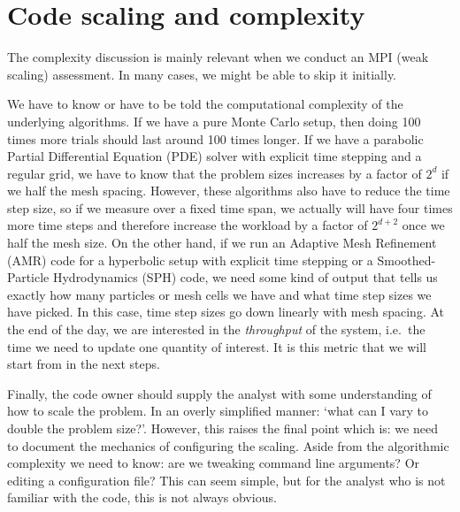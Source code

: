 \section{Code scaling and complexity}
\label{section:preparation:complexity}


\begin{readerguide}
 The complexity discussion is mainly relevant when we conduct an MPI (weak scaling) assessment. 
 In many cases, we might be able to skip it initially.
\end{readerguide}

We have to know or have to be told the computational complexity of the underlying algorithms. 
If we have a pure Monte Carlo setup, then doing 100 times more trials should last around 100 times longer.
If we have a parabolic Partial Differential Equation (PDE) solver with explicit time stepping and a regular grid, we have to know that the problem sizes increases by a factor of $2^d$ if we half the mesh spacing. 
However, these algorithms also have to reduce the time step size, so if we measure over a fixed time span, we actually will have four times more time steps and therefore increase the workload by a factor of $2^{d+2}$ once we half the mesh size.
On the other hand, if we run an Adaptive Mesh Refinement (AMR) code for a hyperbolic setup with explicit time stepping or a Smoothed-Particle Hydrodynamics (SPH) code, we need some kind of output that tells us exactly how many particles or mesh cells we have and what time step sizes we have picked. In this case, time step sizes go down linearly with mesh spacing.
At the end of the day, we are interested in the \emph{throughput} of the system, i.e.~the time we need to update one quantity of interest.
It is this metric that we will start from in the next steps. 

Finally, the code owner should supply the analyst with some understanding of how to scale the problem. In an overly simplified manner: `what can I vary to double the problem size?'. However, this raises the final point which is: we need to document the mechanics of configuring the scaling. Aside from the algorithmic complexity we need to know: are we tweaking command line arguments? Or editing a configuration file? This can seem simple, but for the analyst who is not familiar with the code, this is not always obvious.

